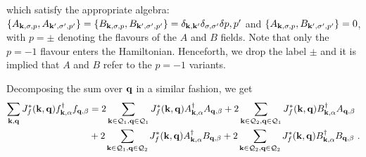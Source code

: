 \documentclass[%
reprint,
superscriptaddress,
groupedaddress,
superscriptaddress,
onecolumn,
10pt
]{revtex4-2}
\begin{document}
which satisfy the appropriate algebra: \(\left\{A_{{\bf k},\sigma, p}, A_{{\bf k}^\prime,\sigma^\prime, p^\prime}\right\} = \left\{B_{{\bf k},\sigma, p}, B_{{\bf k}^\prime,\sigma^\prime, p^\prime}\right\} = \delta_{{\bf k},{\bf k}^\prime}\delta_{\sigma,\sigma^\prime}\delta{p, p^\prime}\) and \(\left\{A_{{\bf k},\sigma,p}, B_{{\bf k}^\prime,\sigma^\prime,p^\prime}\right\} = 0\), with \(p=\pm\) denoting the flavours of the \(A\) and \(B\) fields. Note that only the \(p=-1\) flavour enters the Hamiltonian. Henceforth, we drop the label \(\pm\) and it is implied that \(A\) and \(B\) refer to the \(p=-1\) variants.

Decomposing the sum over \({\bf q}\) in a similar fashion, we get
\begin{equation}\begin{aligned}
	\sum_{{\bf k}, {\bf q}} J_f^*({\bf k},{\bf q}) f^\dagger_{{\bf k},\alpha}f_{{\bf q},\beta} 
	&= 2\sum_{{\bf k} \in \mathcal{Q}_1, {\bf q} \in \mathcal{Q}_1} J_f^*({\bf k},{\bf q}) A^\dagger_{{\bf k},\alpha}A_{{\bf q},\beta} + 2\sum_{{\bf k} \in \mathcal{Q}_2, {\bf q} \in \mathcal{Q}_1} J_f^*({\bf k},{\bf q}) B^\dagger_{{\bf k},\alpha}A_{{\bf q},\beta} \\
	&+ 2\sum_{{\bf k} \in \mathcal{Q}_1, {\bf q} \in \mathcal{Q}_2} J_f^*({\bf k},{\bf q}) A^\dagger_{{\bf k},\alpha}B_{{\bf q},\beta} + 2\sum_{{\bf k} \in \mathcal{Q}_2, {\bf q} \in \mathcal{Q}_2} J_f^*({\bf k},{\bf q}) B^\dagger_{{\bf k},\alpha}B_{{\bf q},\beta}~.
\end{aligned}\end{equation}
\end{document}
